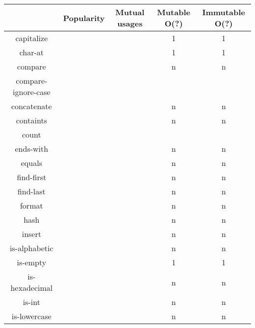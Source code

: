 \documentclass[anonymous,sigplan,review,11pt,nonacm,natbib=false]{acmart}
\begin{document}
    \begin{table*}[]
        \centering
        \begin{tabular}{|c||c|c|c|c|}
            \hline
            & Popularity & Mutual usages & Mutable O(?) & Immutable O(?) \\ \hline \hline
            capitalize &  &  & 1 & 1 \\ \hline

            char-at &  &  & 1 & 1 \\ \hline

            compare &  &  & n & n \\ \hline

            compare-ignore-case &  &  &  & \\ \hline

            concatenate &  &  & n & n \\ \hline

            containts &  &  & n & n \\ \hline

            count &  &  &  & \\ \hline

            ends-with &  &  & n & n \\ \hline

            equals &  &  & n & n \\ \hline

            find-first &  &  & n & n \\ \hline

            find-last &  &  & n & n \\ \hline

            format &  &  & n & n \\ \hline

            hash &  &  & n & n \\ \hline

            insert &  &  & n & n \\ \hline

            is-alphabetic &  &  & n & n \\ \hline

            is-empty &  &  & 1 & 1 \\ \hline

            is-hexadecimal &  &  & n & n \\ \hline

            is-int &  &  & n & n \\ \hline

            is-lowercase &  &  & n & n \\ \hline


\end{tabular}
\end{table*}
\end{document}
